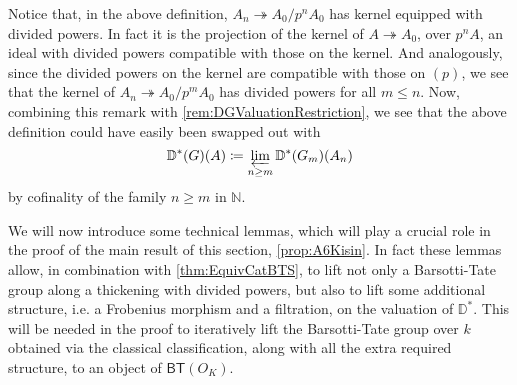 \begin{rem}[]
	Notice that, in the above definition, $A_n \twoheadrightarrow A_0/p^nA_0$
	has kernel equipped with divided powers.
	In fact it is the projection of the kernel of $A \twoheadrightarrow A_0$, over
	$p^nA$, an ideal with divided powers compatible with those on the kernel.
	And analogously, since the divided powers on the kernel are compatible with those 
	on $(p)$, we see that the kernel of $A_n \twoheadrightarrow A_0/p^mA_0$
	has divided powers for all $m \leq n$.
	Now, combining this remark with \cref{rem:DGValuationRestriction},
	we see that the above definition could have easily been swapped out with
	\begin{equation*}
		\mathbb{D}^*(G)(A) \coloneqq
		\varprojlim_{n \geq m} \mathbb{D}^*(G_m)(A_n)
	\end{equation*}
	by cofinality of the family $n \geq m$ in $\mathbb{N}$.
\end{rem}


\begin{rem}[]
	We will now introduce some technical lemmas, which will play a crucial role
	in the proof of the main result of this section, \cref{prop:A6Kisin}.
	In fact these lemmas allow, in combination with \cref{thm:EquivCatBTS},
	to lift not only a Barsotti-Tate group along a thickening with divided
	powers, but also to lift some additional structure, i.e.
	a Frobenius morphism and a filtration, on the valuation of $\mathbb{D}^*$.
	This will be needed in the proof to iteratively lift the
	Barsotti-Tate group over $k$ obtained via the classical classification,
	along with all the extra required structure, to an object of $\mathsf{BT}(O_K)$.
\end{rem}


